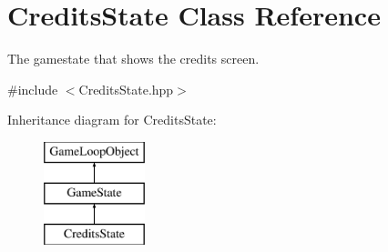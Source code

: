 \hypertarget{class_credits_state}{}\section{Credits\+State Class Reference}
\label{class_credits_state}


The gamestate that shows the credits screen.  




{\ttfamily \#include $<$Credits\+State.\+hpp$>$}

Inheritance diagram for Credits\+State\+:\begin{figure}[H]
\begin{center}
\leavevmode
\includegraphics[height=3.000000cm]{class_credits_state}
\end{center}
\end{figure}
